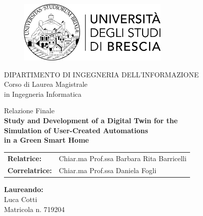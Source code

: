 \begin{titlepage}
    \vspace{10mm}
    
    \begin{figure}[H] %
        \centering
        \includegraphics[width=72.4mm]{images/logo_unibs}
    \end{figure}
    
    \begin{center}
        \Large{\uppercase{Dipartimento di Ingegneria dell'Informazione}}\\
        \vspace{4mm}
        \large{Corso di Laurea Magistrale\\
        in Ingegneria Informatica}
    \end{center}

    \vspace{4mm}

    \begin{center}
        \large{Relazione Finale}\\
        \LARGE{\textbf{Study and Development of a Digital Twin for the\\
        Simulation of User-Created Automations\\
        in a Green Smart Home}}\\
    \end{center}

    \vspace{4mm}
    
    \begin{flushleft}
        \large
        \begin{tabular}{ll}
            \large\textbf{Relatrice:} & Chiar.ma Prof.ssa Barbara Rita Barricelli\\
            \large\textbf{Correlatrice:} & Chiar.ma Prof.ssa Daniela Fogli \\
        \end{tabular}
    \end{flushleft}

    \vspace{2mm}
    
    \begin{flushright}
        \large
        \textbf{Laureando:}\\
        Luca Cotti\\
        Matricola n. 719204\\
    \end{flushright}

    \vspace*{\fill} %

    \centering{\rule{0.6\textwidth}{0.6pt}}\\ %
\end{titlepage}
